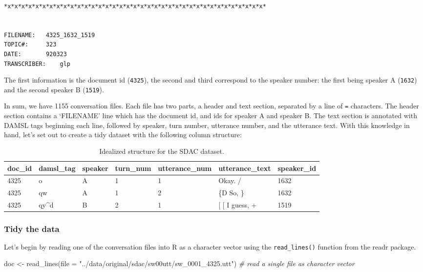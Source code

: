 \documentclass[
]{article}
\newenvironment{Shaded}{\begin{snugshade}}{\end{snugshade}}
\newcommand{\AttributeTok}[1]{\textcolor[rgb]{0.77,0.63,0.00}{#1}}
\newcommand{\CommentTok}[1]{\textcolor[rgb]{0.56,0.35,0.01}{\textit{#1}}}
\newcommand{\FunctionTok}[1]{\textcolor[rgb]{0.00,0.00,0.00}{#1}}
\newcommand{\NormalTok}[1]{#1}
\newcommand{\OtherTok}[1]{\textcolor[rgb]{0.56,0.35,0.01}{#1}}
\newcommand{\StringTok}[1]{\textcolor[rgb]{0.31,0.60,0.02}{#1}}
\begin{document}
\begin{verbatim}
*x*x*x*x*x*x*x*x*x*x*x*x*x*x*x*x*x*x*x*x*x*x*x*x*x*x*x*x*x*x*x*x*x*x*x*x*x*


FILENAME:   4325_1632_1519
TOPIC#:     323
DATE:       920323
TRANSCRIBER:    glp
\end{verbatim}

The first information is the document id (\texttt{4325}), the second and third correspond to the speaker number: the first being speaker A (\texttt{1632}) and the second speaker B (\texttt{1519}).

In sum, we have 1155 conversation files. Each file has two parts, a header and text section, separated by a line of \texttt{=} characters. The header section contains a `FILENAME' line which has the document id, and ids for speaker A and speaker B. The text section is annotated with DAMSL tags beginning each line, followed by speaker, turn number, utterance number, and the utterance text. With this knowledge in hand, let's set out to create a tidy dataset with the following column structure:

\begin{table}

\caption{\label{tab:cd-semi-sdac-idealized-dataset}Idealized structure for the SDAC dataset.}
\centering
\begin{tabular}[t]{lllllll}
\toprule
doc\_id & damsl\_tag & speaker & turn\_num & utterance\_num & utterance\_text & speaker\_id\\
\midrule
4325 & o & A & 1 & 1 & Okay.  / & 1632\\
4325 & qw & A & 1 & 2 & \{D So, \} & 1632\\
4325 & qy\textasciicircum{}d & B & 2 & 1 & {}[ [ I guess, + & 1519\\
\bottomrule
\end{tabular}
\end{table}

\hypertarget{tidy-the-data-1}{%
\subsubsection{Tidy the data}\label{tidy-the-data-1}}

Let's begin by reading one of the conversation files into R as a character vector using the \texttt{read\_lines()} function from the readr package.

\begin{Shaded}
\begin{Highlighting}[]
\NormalTok{doc }\OtherTok{\textless{}{-}} \FunctionTok{read\_lines}\NormalTok{(}\AttributeTok{file =} \StringTok{"../data/original/sdac/sw00utt/sw\_0001\_4325.utt"}\NormalTok{)  }\CommentTok{\# read a single file as character vector}
\end{Highlighting}
\end{Shaded}
\end{document}
